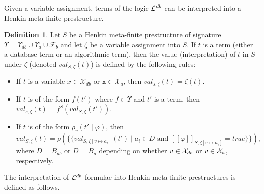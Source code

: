 \documentclass[preprint,11pt]{elsarticle}
\theoremstyle{definition}
\newtheorem{definition}{Definition}[section]
\theoremstyle{remark}
\begin{document}
Given a variable assignment, terms of the logic ${\cal L}^{db}$ can be interpreted into a Henkin meta-finite prestructure. 

\begin{definition}\label{termsInterpretation}
Let $S$ be a Henkin meta-finite prestructure of signature $\Upsilon=\Upsilon_{db}\cup\Upsilon_a\cup\mathcal{F}_b$ and let $\zeta$ be a variable assignment into $S$. If $t$ is a term (either a database term or an algorithmic term), then the value (interpretation) of $t$ in $S$ under $\zeta$ (denoted $val_{S,\zeta}(t)$) is defined by the following rules:
\begin{itemize}
    \item If $t$ is a variable $x \in \mathcal{X}_{db}$ or $\texttt{x} \in \mathcal{X}_{a}$, then $val_{s,\zeta}(t) = \zeta(t)$.
    \item If $t$ is of the form $f(t')$ where $f \in \Upsilon$ and $t'$ is a term, then $val_{s,\zeta}(t) = f^S(val_{S,\zeta}(t'))$.
    \item If $t$ is of the form  $\rho_{v}(t' \mid \varphi)$, then \[val_{S,\zeta}(t)= \rho(\{\!\!\{val_{S,\zeta[v\mapsto a_i]}(t') \mid a_i \in D \text{ and } [\![\varphi]\!]_{S,\zeta[v \mapsto a_i]}=true \}\!\!\}),\] where $D = B_{db}$ or $D = B_{a}$ depending on whether $v \in {\cal X}_{db}$ or $v \in {\cal X}_{a}$, respectively.
\end{itemize}
\end{definition}

The interpretation of ${\cal L}^{db}$-formulae into Henkin meta-finite prestructures is defined as follows.  
\end{document}
